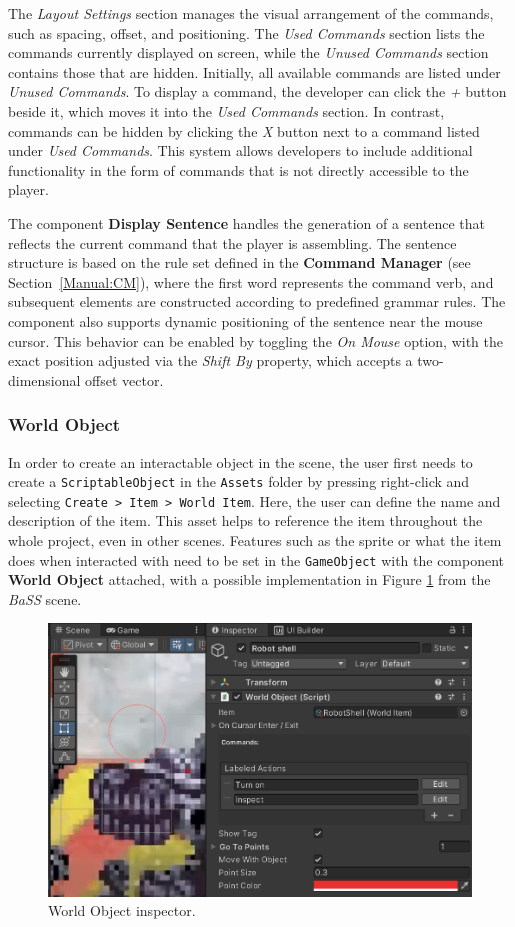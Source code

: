 The \textit{Layout Settings} section manages the visual arrangement of the commands, such as spacing, offset, and positioning. The \textit{Used Commands} section lists the commands currently displayed on screen, while the \textit{Unused Commands} section contains those that are hidden. Initially, all available commands are listed under \textit{Unused Commands}. To display a command, the developer can click the \textit{+} button beside it, which moves it into the \textit{Used Commands} section. In contrast, commands can be hidden by clicking the \textit{X} button next to a command listed under \textit{Used Commands}. This system allows developers to include additional functionality in the form of commands that is not directly accessible to the player.

The component \textbf{Display Sentence} handles the generation of a sentence that reflects the current command that the player is assembling. The sentence structure is based on the rule set defined in the \textbf{Command Manager} (see Section~\ref{Manual:CM}), where the first word represents the command verb, and subsequent elements are constructed according to predefined grammar rules. The component also supports dynamic positioning of the sentence near the mouse cursor. This behavior can be enabled by toggling the \textit{On Mouse} option, with the exact position adjusted via the \textit{Shift By} property, which accepts a two-dimensional offset vector.

\subsubsection{World Object}
\label{Manual:WO}
In order to create an interactable object in the scene, the user first needs to create a \verb|ScriptableObject| in the \verb|Assets| folder by pressing right-click and selecting \verb|Create > Item > World Item|. Here, the user can define the name and description of the item. This asset helps to reference the item throughout the whole project, even in other scenes. Features such as the sprite or what the item does when interacted with need to be set in the \verb|GameObject| with the component \textbf{World Object} attached, with a possible implementation in Figure \ref{fig:Manual-WO} from the \textit{BaSS} scene. 

\begin{figure}[H]
\centering
\includegraphics[width=.8\linewidth]{img/User doc/world_object.png}
\caption{World Object inspector.}
\label{fig:Manual-WO}
\end{figure}

